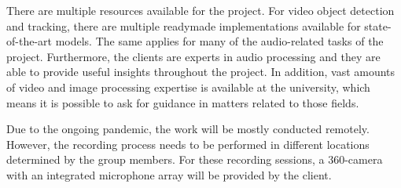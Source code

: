 There are multiple resources available for the project. For video object detection and tracking, there are multiple
readymade implementations available for state-of-the-art models. The same applies for many of the audio-related
tasks of the project. Furthermore, the clients are experts in audio processing and they are able to provide useful
insights throughout the project. In addition, vast amounts of video and image processing expertise is available at the university, which means it
is possible to ask for guidance in matters related to those fields.

Due to the ongoing pandemic, the work will be mostly conducted remotely. However, the recording process needs to be
performed in different locations determined by the group members. For these recording sessions, a 360-camera with an
integrated microphone array will be provided by the client.